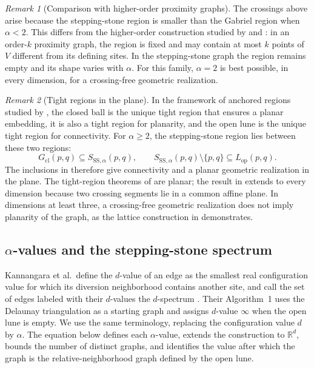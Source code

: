 \documentclass[a4paper,fleqn]{cas-sc}
\theoremstyle{definition}
\theoremstyle{remark}
\newtheorem{remark}{Remark}
\newcommand{\R}{\mathds{R}}
\newcommand{\0}{\mathbf{0}}
\begin{document}
\begin{remark}[Comparison with higher-order proximity graphs]
The crossings above arise because the stepping-stone region is smaller
than the Gabriel region when $\alpha<2$. This differs from the higher-order
construction studied by \citet{abrego2011crossing} and
\citet{bose2013properties}: in an order-$k$ proximity graph, the region is
fixed and may contain at most $k$ points of $V$ different from its defining
sites. In the stepping-stone graph the region remains empty and its shape
varies with $\alpha$. For this family, $\alpha=2$ is best possible, in every
dimension, for a crossing-free geometric realization.
\end{remark}

\begin{remark}[Tight regions in the plane]
In the framework of anchored regions studied by
\citet{cardinal2009empty}, the closed ball is the unique tight region that
ensures a planar embedding, it is also a tight region for planarity, and the
open lune is the unique tight region for connectivity. For $\alpha\geq2$, the
stepping-stone region lies between these two regions:
\begin{equation}
    G_{\mathrm{cl}}(p,q)
    \subseteq
    S_{\mathrm{SS},\alpha}(p,q),
    \qquad
    S_{\mathrm{SS},\alpha}(p,q)\setminus\{p,q\}
    \subseteq
    L_{\mathrm{op}}(p,q).
\end{equation}
The inclusions in  therefore give connectivity and a
planar geometric realization in the plane. The tight-region theorems of
\citet{cardinal2009empty} are planar; the result in
 extends to every dimension because two crossing
segments lie in a common affine plane. In dimensions at least three, a
crossing-free geometric realization does not imply planarity of the graph,
as the lattice construction in
 demonstrates.
\end{remark}

\clearpage

\subsection{$\alpha$-values and the stepping-stone spectrum}
\label{sec:alpha-spectrum}

Kannangara et al.\ define the $d$-value of an edge as the smallest real
configuration value for which its diversion neighborhood contains another
site, and call the set of edges labeled with their $d$-values the
$d$-spectrum \citep[Def.~3.12]{kannangara2018stepping}. Their Algorithm~1
uses the Delaunay triangulation as a starting graph and assigns $d$-value
$\infty$ when the open lune is empty. We use the same terminology, replacing
the configuration value $d$ by $\alpha$. The equation below defines each
$\alpha$-value, extends the construction to $\R^d$, bounds the number of
distinct graphs, and identifies the value after which the graph is the
relative-neighborhood graph defined by the open lune.
\end{document}
